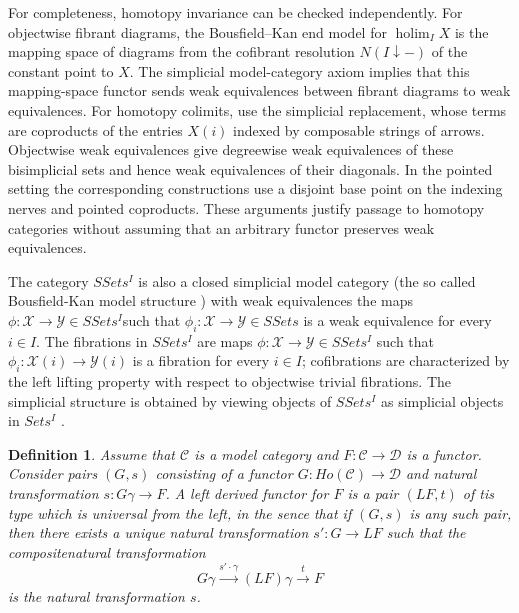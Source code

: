 \documentclass[11pt,a4paper]{article}
\newtheorem{definition}[theorem]{Definition} %
\begin{document}
For completeness, homotopy invariance can be checked independently.
For objectwise fibrant diagrams, the Bousfield--Kan end model for
$\operatorname{holim}_I X$ is the mapping space of diagrams from the
cofibrant resolution $N(I\downarrow -)$ of the constant point to $X$.
The simplicial model-category axiom implies that this mapping-space
functor sends weak equivalences between fibrant diagrams to weak
equivalences.  For homotopy colimits, use the simplicial replacement,
whose terms are coproducts of the entries $X(i)$ indexed by composable
strings of arrows.  Objectwise weak equivalences give degreewise weak
equivalences of these bisimplicial sets and hence weak equivalences of
their diagonals.  In the pointed setting the corresponding constructions
use a disjoint base point on the indexing nerves and pointed coproducts.
These arguments justify passage to homotopy categories without assuming
that an arbitrary functor preserves weak equivalences.

The category $SSets^I$ is also a closed simplicial model category (the so called Bousfield-Kan model structure \cite[\S 8, Ch. XI]{BK}) with weak equivalences the maps $\phi:\mathcal{X}\rightarrow \mathcal{Y}\in SSets^I$such that $\phi_i:\mathcal{X}\rightarrow \mathcal{Y}\in SSets$ is a weak equivalence for every $i\in I$. The fibrations in $SSets^I$ are maps $\phi:\mathcal{X}\rightarrow \mathcal{Y}\in SSets^I$ 
such that $\phi_i:\mathcal X(i)\rightarrow\mathcal Y(i)$ is a fibration
for every $i\in I$; cofibrations are characterized by the left lifting
property with respect to objectwise trivial fibrations.  The simplicial
structure is obtained by viewing objects of $SSets^I$ as simplicial objects
in $Sets^I$ \cite[Section~5]{Hir2}.

\begin{definition} Assume that $\mathcal{C}$ is a model category and $F:\mathcal{C}\rightarrow \mathcal{D}$ is a functor. Consider pairs $(G,s)$ consisting of a functor $G: Ho(\mathcal{C})\rightarrow \mathcal{D}$ and natural transformation $s:G\gamma\rightarrow F$. A left derived functor for $F$ is a pair $(LF,t)$ of tis type which is universal from the left, in the sence that if $(G,s)$ is any such pair, then there exists a unique natural transformation $s':G\rightarrow LF$ such that the compositenatural transformation $$G\gamma\xrightarrow{s'\cdot \gamma} (LF)\gamma\xrightarrow{t} F$$ 
is the natural transformation $s$.
\end{definition}
\end{document}
